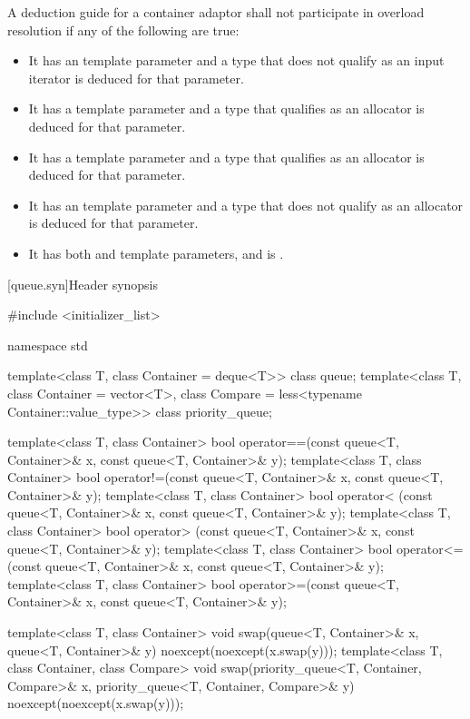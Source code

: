 \pnum
A deduction guide for a container adaptor shall not participate in overload resolution if any of the following are true:
\begin{itemize}
\item It has an  template parameter and a type that does not qualify as an input iterator is deduced for that parameter.
\item It has a  template parameter and a type that qualifies as an allocator is deduced for that parameter.
\item It has a  template parameter and a type that qualifies as an allocator is deduced for that parameter.
\item It has an  template parameter and a type that does not qualify as an allocator is deduced for that parameter.
\item It has both  and  template parameters, and  is .
\end{itemize}

[queue.syn]{Header  synopsis}%
%

\begin{codeblock}
#include <initializer_list>

namespace std {
  template<class T, class Container = deque<T>> class queue;
  template<class T, class Container = vector<T>,
           class Compare = less<typename Container::value_type>>
    class priority_queue;

  template<class T, class Container>
    bool operator==(const queue<T, Container>& x, const queue<T, Container>& y);
  template<class T, class Container>
    bool operator!=(const queue<T, Container>& x, const queue<T, Container>& y);
  template<class T, class Container>
    bool operator< (const queue<T, Container>& x, const queue<T, Container>& y);
  template<class T, class Container>
    bool operator> (const queue<T, Container>& x, const queue<T, Container>& y);
  template<class T, class Container>
    bool operator<=(const queue<T, Container>& x, const queue<T, Container>& y);
  template<class T, class Container>
    bool operator>=(const queue<T, Container>& x, const queue<T, Container>& y);

  template<class T, class Container>
    void swap(queue<T, Container>& x, queue<T, Container>& y) noexcept(noexcept(x.swap(y)));
  template<class T, class Container, class Compare>
    void swap(priority_queue<T, Container, Compare>& x,
              priority_queue<T, Container, Compare>& y) noexcept(noexcept(x.swap(y)));
}
\end{codeblock}


